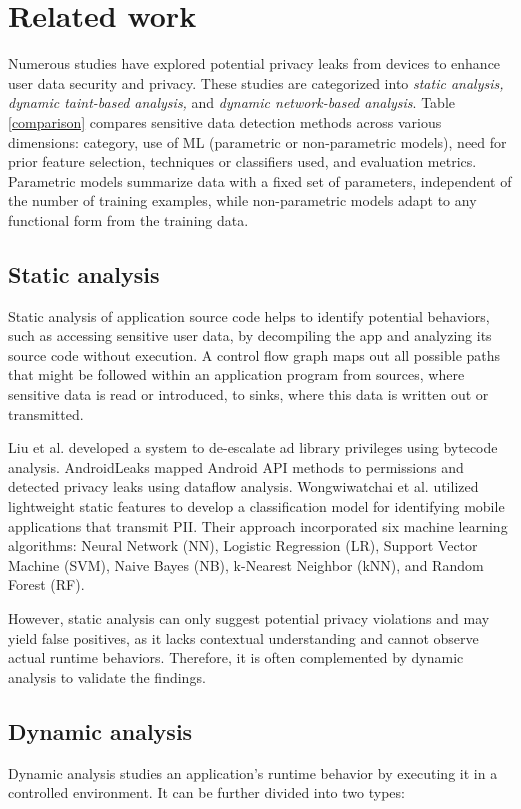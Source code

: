 \section{Related work}
\label{Section2}
Numerous studies have explored potential privacy leaks from devices to enhance user data security and privacy. These studies are categorized into \textit{static analysis, dynamic taint-based analysis,} and \textit{dynamic network-based analysis}. Table \ref{comparison} compares sensitive data detection methods across various dimensions: category, use of ML (parametric or non-parametric models), need for prior feature selection, techniques or classifiers used, and evaluation metrics. Parametric models summarize data with a fixed set of parameters, independent of the number of training examples, while non-parametric models adapt to any functional form from the training data.
\subsection{Static analysis}
Static analysis of application source code helps to identify potential behaviors, such as accessing sensitive user data\cite{leakminer}, by decompiling the app and analyzing its source code without execution. A control flow graph maps out all possible paths that might be followed within an application program from sources, where sensitive data is read or introduced, to sinks, where this data is written out or transmitted.

Liu et al. \cite{liu} developed a system to de-escalate ad library privileges using bytecode analysis. AndroidLeaks \cite{androidleaks} mapped Android API methods to permissions and detected privacy leaks using dataflow analysis. Wongwiwatchai et al. \cite{lightweight} utilized lightweight static features to develop a classification model for identifying mobile applications that transmit PII. Their approach incorporated six machine learning algorithms: Neural Network (NN), Logistic Regression (LR), Support Vector Machine (SVM), Naive Bayes (NB), k-Nearest Neighbor (kNN), and Random Forest (RF).

However, static analysis can only suggest potential privacy violations and may yield false positives, as it lacks contextual understanding and cannot observe actual runtime behaviors. Therefore, it is often complemented by dynamic analysis to validate the findings.
\subsection{Dynamic analysis}
Dynamic analysis studies an application's runtime behavior by executing it in a controlled environment. It can be further divided into two types:
